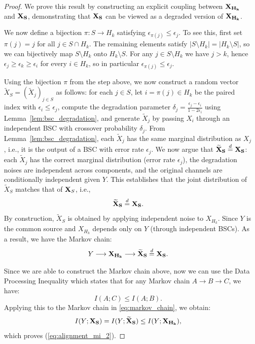 \documentclass{article}
\theoremstyle{plain}
\theoremstyle{definition}
\theoremstyle{remark}
\begin{document}
\begin{proof}
We prove this result by constructing an explicit coupling between ${\bf X_{H_k}}$ and ${\bf X_S}$, demonstrating that ${\bf X_S}$ can be viewed as a degraded version of ${\bf X_{H_k}}$.

We now define a bijection $\pi: S \to H_k$ satisfying $\epsilon_{\pi(j)} \le \epsilon_j$. To see this, first set $\pi(j)=j$ for all $j\in S\cap H_k$.
The remaining elements satisfy $|S\setminus H_k|=|H_k\setminus S|$, so we can bijectively map
$S\setminus H_k$ onto $H_k\setminus S$. For any $j\in S\setminus H_k$ we have $j>k$, hence
$\epsilon_j\ge \epsilon_k\ge \epsilon_i$ for every $i\in H_k$, so in particular
$\epsilon_{\pi(j)}\le \epsilon_j$.


Using the bijection $\pi$ from the step above, we now construct a random vector $\widetilde{X}_S = (\widetilde{X}_j)_{j \in S}$ as follows: for each $j \in S$, let $i=\pi(j)\in H_k$ be the paired index with $\epsilon_i \le \epsilon_j$, compute the degradation parameter $\delta_j=\frac{\epsilon_j-\epsilon_i}{1-2\epsilon_i}$ using Lemma~\ref{lem:bsc_degradation}, and generate $\widetilde{X}_j$ by passing $X_i$ through an independent BSC with crossover probability $\delta_j$. From Lemma~\ref{lem:bsc_degradation}, each $\widetilde{X}_j$ has the same marginal distribution as $X_j$, i.e., it is the output of a BSC with error rate $\epsilon_j$. We now argue that ${\bf \widetilde{X}_S} \stackrel{d}{=} {\bf X_S}$: each $\widetilde{X}_j$ has the correct marginal distribution (error rate $\epsilon_j$), the degradation noises are independent across components, and the original channels are conditionally independent given $Y$. This establishes that the joint distribution of $\widetilde{X}_S$ matches that of ${\bf X}_S$, i.e.,
\begin{equation}
\label{eq:dist_equivalence}
   {\bf  \widetilde{X}_S} \stackrel{d}{=} {\bf X_S}.
\end{equation}
By construction, $\widetilde{X}_S$ is obtained by applying independent noise to $X_{H_k}$. Since $Y$ is the common source and $X_{H_k}$ depends only on $Y$ (through independent BSCs). As a result, we have the Markov chain:
\begin{equation}
\label{eq:markov_chain}
    Y \longrightarrow {\bf X_{H_k}} \longrightarrow {\bf \widetilde{X}_S} \stackrel{d}{=} {\bf X_S}.
\end{equation}

Since we are able to construct the Markov chain above, now we can use the Data Processing Inequality\citep{Cover2006} which states that for any Markov chain $A \to B \to C$, we have:
\begin{equation}
    I(A; C) \le I(A; B).
\end{equation}
Applying this to the Markov chain in \cref{eq:markov_chain}, we obtain:
\begin{equation}
    I(Y; {\bf X_S}) = I(Y; {\bf \widetilde{X}_S}) \le I(Y; {\bf X_{H_k}}),
\end{equation}
which proves (\ref{eq:alignment_mi_2}).



\end{proof}
\end{document}
